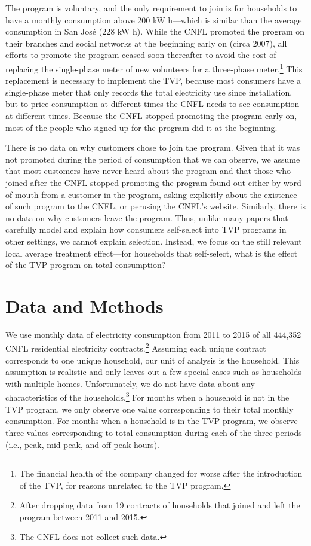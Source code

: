 \documentclass[12pt]{article}
\begin{document}
The program is voluntary, and the only requirement to join is for households to have a monthly consumption above $200$ kW h---which is similar than the average consumption in San José ($228$ kW h). While the CNFL promoted the program on their branches and social networks at the beginning early on (circa 2007), all efforts to promote the program ceased soon thereafter to avoid the cost of replacing the single-phase meter of new volunteers for a three-phase meter.\footnote{The financial health of the company changed for worse after the introduction of the TVP, for reasons unrelated to the TVP program.} This replacement is necessary to implement the TVP, because most consumers have a single-phase meter that only records the total electricity use since installation, but to price consumption at different times the CNFL needs to see consumption at different times. Because the CNFL stopped promoting the program early on, most of the people who signed up for the program did it at the beginning.

There is no data on why customers chose to join the program. Given that it was not promoted during the period of consumption that we can observe, we assume that most customers have never heard about the program and that those who joined after the CNFL stopped promoting the program found out either by word of mouth from a customer in the program, asking explicitly about the existence of such program to the CNFL, or perusing the CNFL’s website. Similarly, there is no data on why customers leave the program. Thus, unlike many papers that carefully model and explain how consumers self-select into TVP programs in other settings, we cannot explain selection. Instead, we focus on the still relevant local average treatment effect---for households that self-select, what is the effect of the TVP program on total consumption?

\section{Data and Methods}

We use monthly data of electricity consumption from 2011 to 2015 of all 444,352 CNFL residential electricity contracts.\footnote{After dropping data from 19 contracts of households that joined and left the program between 2011 and 2015.} Assuming each unique contract corresponds to one unique household, our unit of analysis is the household. This assumption is realistic and only leaves out a few special cases such as households with multiple homes. Unfortunately, we do not have data about any characteristics of the households.\footnote{The CNFL does not collect such data.} For months when a household is not in the TVP program, we only observe one value corresponding to their total monthly consumption. For months when a household is in the TVP program, we observe three values corresponding to total consumption during each of the three periods (i.e., peak, mid-peak, and off-peak hours).
\end{document}
